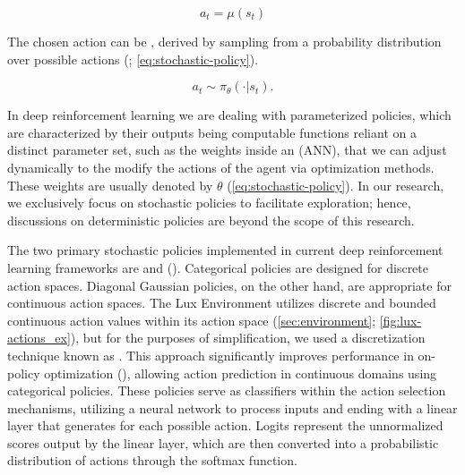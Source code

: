     \begin{equation}
        a_t = \mu(s_t)
        \label{eq:deterministic-policy}
    \end{equation}
    
    \noindent The chosen action can be , derived by sampling from a probability distribution over possible actions (\textcolor{deepblue}{\cite{Sutton1998}; \autoref{eq:stochastic-policy}}).
    
    \begin{equation}
        a_t \sim \pi_{\theta}(\cdot | s_t).
        \label{eq:stochastic-policy}
    \end{equation}
    
    \noindent In deep reinforcement learning we are dealing with parameterized policies, which are characterized by their outputs being computable functions reliant on a distinct parameter set, such as the weights inside an  (ANN), that we can adjust dynamically to the modify the actions of the agent via optimization methods. These weights are usually denoted by $\theta$ (\textcolor{deepblue}{\autoref{eq:stochastic-policy}}). In our research, we exclusively focus on stochastic policies to facilitate exploration; hence, discussions on deterministic policies are beyond the scope of this research.
    
    \bigskip
    
    \noindent The two primary stochastic policies implemented in current deep reinforcement learning frameworks are  and  (\textcolor{deepblue}{\cite{SpinningUp2018}}). Categorical policies are designed for discrete action spaces. Diagonal Gaussian policies, on the other hand, are appropriate for continuous action spaces. The Lux Environment utilizes discrete and bounded continuous action values within its action space (\autoref{sec:environment}; \autoref{fig:lux-actions_ex}), but for the purposes of simplification, we used a discretization technique known as . This approach significantly improves performance in on-policy optimization (\textcolor{deepblue}{\cite{tang2020discretizing}}), allowing action prediction in continuous domains using categorical policies. These policies serve as classifiers within the action selection mechanisms, utilizing a neural network to process inputs and ending with a linear layer that generates  for each possible action. Logits represent the unnormalized scores output by the linear layer, which are then converted into a probabilistic distribution of actions through the softmax function.
    
